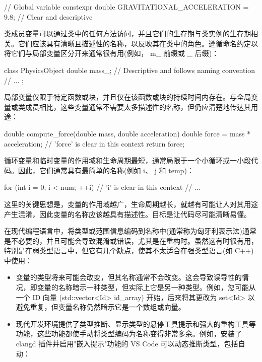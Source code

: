 \begin{cpp}
// Global variable
constexpr double GRAVITATIONAL_ACCELERATION = 9.8; // Clear and descriptive
\end{cpp}

类成员变量可以通过类中的任何方法访问，并且它们的生存期与类实例的生存期相关。它们应该具有清晰且描述性的名称，以反映其在类中的角色。遵循命名约定以将它们与局部变量区分开来通常很有用(例如， m\_ 前缀或 \_ 后缀)：

\begin{cpp}
class PhysicsObject {
    double mass_; // Descriptive and follows naming convention
    // ...
};
\end{cpp}

局部变量仅限于特定函数或块，并且仅在该函数或块的持续时间内存在。与全局变量或类成员相比，这些变量通常不需要太多描述性的名称，但仍应清楚地传达其用途：

\begin{cpp}
double compute_force(double mass, double acceleration) {
    double force = mass * acceleration; // 'force' is clear in this context
    return force;
}
\end{cpp}

循环变量和临时变量的作用域和生命周期最短，通常局限于一个小循环或一小段代码。因此，它们通常具有最简单的名称(例如 i、 j 和 temp)：

\begin{cpp}
for (int i = 0; i < num; ++i) { // 'i' is clear in this context
    // ...
}
\end{cpp}

这里的关键思想是，变量的作用域越广，生命周期越长，就越有可能让人对其用途产生混淆，因此变量的名称应该越具有描述性。目标是让代码尽可能清晰易懂。


在现代编程语言中，将类型或范围信息编码到名称中(通常称为匈牙利表示法)通常是不必要的，并且可能会导致混淆或错误，尤其是在重构时。虽然这有时很有用，特别是在弱类型语言中，但它有几个缺点，使其不太适合在强类型语言(如 C++)中使用：

\begin{itemize}
\item
变量的类型将来可能会改变，但其名称通常不会改变。这会导致误导性的情况，即变量的名称暗示一种类型，但实际上它是另一种类型。例如，您可能从一个 ID 向量 (std::vector<Id> id\_array) 开始，后来将其更改为 set<Id> 以避免重复，但变量名称仍然暗示它是一个数组或向量。

\item
现代开发环境提供了类型推断、显示类型的悬停工具提示和强大的重构工具等功能，这些功能都使手动将类型编码为名称变得非常多余。例如，安装了 clangd 插件并启用"嵌入提示"功能的 VS Code 可以动态推断类型，包括自动：


\end{itemize}

